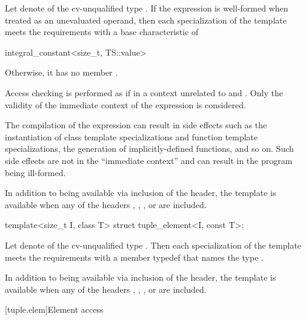 \begin{itemdescr}
\pnum
Let  denote  of the cv-unqualified type .
If the expression  is well-formed
when treated as an unevaluated operand, then
each specialization of the template meets the  requirements
with a base characteristic of
\begin{codeblock}
integral_constant<size_t, TS::value>
\end{codeblock}
Otherwise, it has no member .

\pnum
Access checking is performed as if in a context
unrelated to  and .
Only the validity of the immediate context of the expression is considered.
\begin{note}
The compilation of the expression can result in side effects
such as the instantiation of class template specializations and
function template specializations, the generation of implicitly-defined functions, and so on.
Such side effects are not in the ``immediate context'' and
can result in the program being ill-formed.
\end{note}

\pnum
In addition to being available via inclusion of the  header,
the template is available
when any of the headers
,
,
, or
are included.
\end{itemdescr}

%
\begin{itemdecl}
template<size_t I, class T> struct tuple_element<I, const T>;
\end{itemdecl}

\begin{itemdescr}
\pnum
Let  denote  of the cv-unqualified type . Then
each specialization of the template meets the  requirements
with a member typedef  that names the type .

\pnum
In addition to being available via inclusion of the  header,
the template is available
when any of the headers
,
,
, or
are included.
\end{itemdescr}

[tuple.elem]{Element access}

